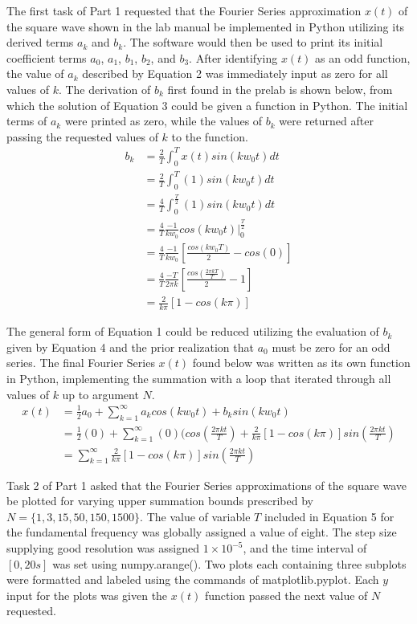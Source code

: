 \documentclass[12pt]{report}
\begin{document}
The first task of Part 1 requested that the Fourier Series approximation $ x(t) $ of the square wave shown in the lab manual be implemented in Python utilizing its derived terms $ a_k $ and $ b_k $. The software would then be used to print its initial coefficient terms $ a_0 $, $ a_1 $, $ b_1 $, $ b_2 $, and $ b_3 $. After identifying $ x(t) $ as an odd function, the value of $ a_k $ described by Equation 2 was immediately input as zero for all values of $ k $. The derivation of $ b_k $ first found in the prelab is shown below, from which the solution of Equation 3 could be given a function in Python. The initial terms of $ a_k $ were printed as zero, while the values of $ b_k $ were returned after passing the requested values of $ k $ to the function. 
\begin{align*}
	b_k &= \frac{2}{T}\int_{0}^{T}x(t)sin(kw_0t)dt \\
	&= \frac{2}{T}\int_{0}^{T}(1)sin(kw_0t)dt \\
	&= \frac{4}{T}\int_{0}^{\frac{T}{2}}(1)sin(kw_0t)dt \\
	&= \frac{4}{T}\frac{-1}{kw_0}cos(kw_0t)|_0^{\frac{T}{2}} \\
	&= \frac{4}{T}\frac{-1}{kw_0}[\frac{cos(kw_0T)}{2} - cos(0)] \\
	&= \frac{4}{T}\frac{-T}{2\pi k}[\frac{cos(\frac{2\pi kT}{T})}{2} - 1] \\
	&= \frac{2}{k\pi}[1 - cos(k\pi)]
\end{align*}

The general form of Equation 1 could be reduced utilizing the evaluation of $ b_k $ given by Equation 4 and the prior realization that $ a_0 $ must be zero for an odd series. The final Fourier Series $ x(t) $ found below was written as its own function in Python, implementing the summation with a loop that iterated through all values of $ k $ up to argument $ N $.
\begin{align*}
	x(t) &= \frac{1}{2}a_0 + \sum_{k=1}^{\infty}a_kcos(kw_0t) + b_ksin(kw_0t) \\
	&= \frac{1}{2}(0) + \sum_{k=1}^{\infty}(0)(cos(\frac{2\pi kt}{T}) + \frac{2}{k\pi}[1 - cos(k\pi)]sin(\frac{2\pi kt}{T}) \\
	&= \sum_{k=1}^{\infty}\frac{2}{k\pi}[1 - cos(k\pi)]sin(\frac{2\pi kt}{T})
\end{align*}

Task 2 of Part 1 asked that the Fourier Series approximations of the square wave be plotted for varying upper summation bounds prescribed by $ N = \{1,3,15,50,150,1500\} $. The value of variable $ T $ included in Equation 5 for the fundamental frequency was globally assigned a value of eight. The step size supplying good resolution was assigned $ 1 \times 10^{-5} $, and the time interval of $ [0,20s] $ was set using numpy.arange(). Two plots each containing three subplots were formatted and labeled using the commands of matplotlib.pyplot. Each $ y $ input for the plots was given the $ x(t) $ function passed the next value of $ N $ requested. \\
\end{document}
